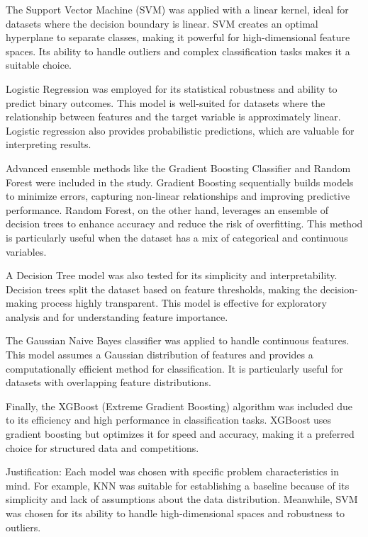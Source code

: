 \documentclass[pdflatex,sn-nature,Numbered]{sn-jnl}%
\theoremstyle{thmstyleone}%
\theoremstyle{thmstyletwo}%
\theoremstyle{thmstylethree}%
\begin{document}
The Support Vector Machine (SVM) was applied with a linear kernel, ideal for datasets where the decision boundary is linear. SVM creates an optimal hyperplane to separate classes, making it powerful for high-dimensional feature spaces. Its ability to handle outliers and complex classification tasks makes it a suitable choice.

Logistic Regression was employed for its statistical robustness and ability to predict binary outcomes. This model is well-suited for datasets where the relationship between features and the target variable is approximately linear. Logistic regression also provides probabilistic predictions, which are valuable for interpreting results.

Advanced ensemble methods like the Gradient Boosting Classifier and Random Forest were included in the study. Gradient Boosting sequentially builds models to minimize errors, capturing non-linear relationships and improving predictive performance. Random Forest, on the other hand, leverages an ensemble of decision trees to enhance accuracy and reduce the risk of overfitting. This method is particularly useful when the dataset has a mix of categorical and continuous variables.

A Decision Tree model was also tested for its simplicity and interpretability. Decision trees split the dataset based on feature thresholds, making the decision-making process highly transparent. This model is effective for exploratory analysis and for understanding feature importance.

The Gaussian Naive Bayes classifier was applied to handle continuous features. This model assumes a Gaussian distribution of features and provides a computationally efficient method for classification. It is particularly useful for datasets with overlapping feature distributions.

Finally, the XGBoost (Extreme Gradient Boosting) algorithm was included due to its efficiency and high performance in classification tasks. XGBoost uses gradient boosting but optimizes it for speed and accuracy, making it a preferred choice for structured data and competitions.

Justification:
Each model was chosen with specific problem characteristics in mind. For example, KNN was suitable for establishing a baseline because of its simplicity and lack of assumptions about the data distribution. Meanwhile, SVM was chosen for its ability to handle high-dimensional spaces and robustness to outliers.
\end{document}
